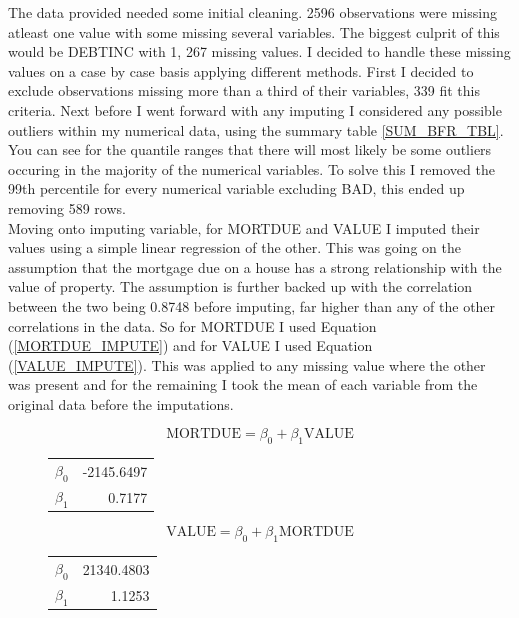 The data provided needed some initial cleaning. 2596 observations were missing atleast one value with some missing several variables. The biggest culprit of this would be DEBTINC with 1, 267 missing values. I decided to handle these missing values on a case by case basis applying different methods. First I decided to exclude observations missing more than a third of their variables,  339 fit this criteria. Next before I went forward with any imputing I considered any possible outliers within my numerical data,  using the summary table \ref{SUM_BFR_TBL}. You can see for the quantile ranges that there will most likely be some outliers occuring in the majority of the numerical variables. To solve this I removed the 99th percentile for every numerical variable excluding BAD,  this ended up removing 589 rows. \\

Moving onto imputing variable,  for MORTDUE and VALUE I imputed their values using a simple linear regression of the other. This was going on the assumption that the mortgage due on a house has a strong relationship with the value of property. The assumption is further backed up with the correlation between the two being 0.8748 before imputing,  far higher than any of the other correlations in the data.  So for MORTDUE I used Equation (\ref{MORTDUE_IMPUTE}) and for VALUE I used Equation (\ref{VALUE_IMPUTE}). This was applied to any missing value where the other was present and for the remaining I took the mean of each variable from the original data before the imputations.

\begin{equation}\label{MORTDUE_IMPUTE}
\text{MORTDUE} = \beta_{0} + \beta_{1}\text{VALUE}
\end{equation}

\begin{figure}[ht]\label{MORTDUE_IMPUTE_COEFS}
	\centering
	\begin{tabular}{lr}
	\hline
	$\beta_{0}$ & -2145.6497 \\
	$\beta_{1}$ & 0.7177 \\
	\hline
	\end{tabular}
\end{figure}

\begin{equation}\label{VALUE_IMPUTE}
\text{VALUE} = \beta_{0} + \beta_{1}\text{MORTDUE}
\end{equation}

\begin{figure}[ht]\label{VALUE_IMPUTE_COEFS}
	\centering
	\begin{tabular}{lr}
	\hline
	$\beta_{0}$ & 21340.4803 \\
	$\beta_{1}$ & 1.1253 \\
	\hline
	\end{tabular}
\end{figure}

